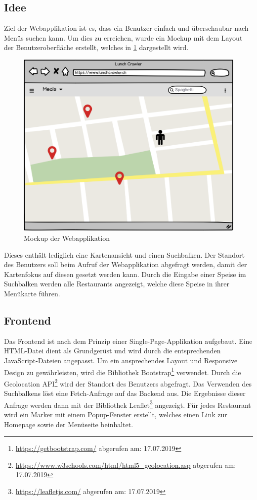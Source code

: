 \subsection{Idee}
Ziel der Webapplikation ist es, dass ein Benutzer einfach und überschaubar nach Menüs suchen kann.
Um dies zu erreichen, wurde ein Mockup mit dem Layout der Benutzeroberfläche erstellt, welches in \cref{fig:webapp_mockup} dargestellt wird.
\begin{figure}[H]
	\centering
	\includegraphics[width=0.7\columnwidth,keepaspectratio]{img/webapp_mockup.png}
	\caption{Mockup der Webapplikation}
	\label{fig:webapp_mockup}
\end{figure}
Dieses enthält lediglich eine Kartenansicht und einen Suchbalken.
Der Standort des Benutzers soll beim Aufruf der Webapplikation abgefragt werden, damit der Kartenfokus auf diesen gesetzt werden kann.
Durch die Eingabe einer Speise im Suchbalken werden alle Restaurants angezeigt, welche diese Speise in ihrer Menükarte führen.
\subsection{Frontend}
Das Frontend ist nach dem Prinzip einer Single-Page-Applikation aufgebaut.
Eine HTML-Datei dient als Grundgerüst und wird durch die entsprechenden JavaScript-Dateien angepasst.
Um ein ansprechendes Layout und Responsive Design zu gewährleisten, wird die Bibliothek \glqq Bootstrap\footnote{\url{https://getbootstrap.com/} abgerufen am: 17.07.2019}\grqq{} verwendet.
Durch die Geolocation API\footnote{\url{https://www.w3schools.com/html/html5_geolocation.asp} abgerufen am: 17.07.2019} wird der Standort des Benutzers abgefragt.
Das Verwenden des Suchbalkens löst eine Fetch-Anfrage auf das Backend aus.
Die Ergebnisse dieser Anfrage werden dann mit der Bibliothek \glqq Leaflet\footnote{\url{https://leafletjs.com/} abgerufen am: 17.07.2019}\grqq{} angezeigt.
Für jedes Restaurant wird ein Marker mit einem Popup-Fenster erstellt, welches einen Link zur Homepage sowie der Menüseite beinhaltet.
